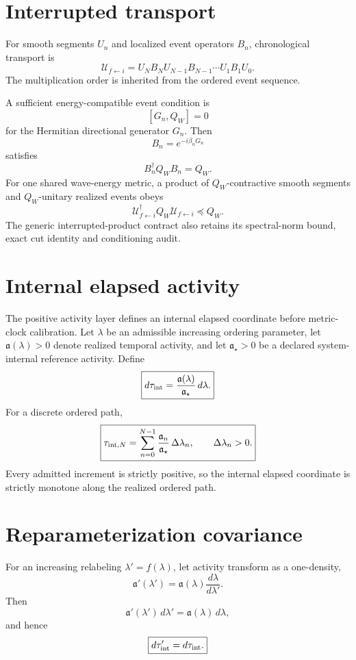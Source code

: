 \section{Interrupted transport}

For smooth segments $U_n$ and localized event operators $B_n$, chronological transport is
\[
\boxed{
\mathcal U_{f\leftarrow i}
=U_NB_NU_{N-1}B_{N-1}\cdots U_1B_1U_0.
}
\]
The multiplication order is inherited from the ordered event sequence.

A sufficient energy-compatible event condition is
\[
[G_n,Q_W]=0
\]
for the Hermitian directional generator $G_n$.  Then
\[
B_n=e^{-i\beta_nG_n}
\]
satisfies
\[
B_n^\dagger Q_WB_n=Q_W.
\]
For one shared wave-energy metric, a product of $Q_W$-contractive smooth segments and $Q_W$-unitary realized events obeys
\[
\boxed{
\mathcal U_{f\leftarrow i}^\dagger
Q_W
\mathcal U_{f\leftarrow i}
\preceq Q_W.
}
\]
The generic interrupted-product contract also retains its spectral-norm bound, exact cut identity and conditioning audit.

\section{Internal elapsed activity}

The positive activity layer defines an internal elapsed coordinate before metric-clock calibration. Let $\lambda$ be an admissible increasing ordering parameter, let $\mathfrak a(\lambda)>0$ denote realized temporal activity, and let $\mathfrak a_\star>0$ be a declared system-internal reference activity. Define
\[
\boxed{
d\tau_{\rm int}
=\frac{\mathfrak a(\lambda)}{\mathfrak a_\star}\,d\lambda.
}
\]
For a discrete ordered path,
\[
\boxed{
\tau_{{\rm int},N}
=\sum_{n=0}^{N-1}
\frac{\mathfrak a_n}{\mathfrak a_\star}\,\Delta\lambda_n,
\qquad
\Delta\lambda_n>0.
}
\]
Every admitted increment is strictly positive, so the internal elapsed coordinate is strictly monotone along the realized ordered path.

\section{Reparameterization covariance}

For an increasing relabeling $\lambda'=f(\lambda)$, let activity transform as a one-density,
\[
\mathfrak a'(\lambda')
=\mathfrak a(\lambda)\frac{d\lambda}{d\lambda'}.
\]
Then
\[
\mathfrak a'(\lambda')\,d\lambda'
=\mathfrak a(\lambda)\,d\lambda,
\]
and hence
\[
\boxed{d\tau'_{\rm int}=d\tau_{\rm int}.}
\]

